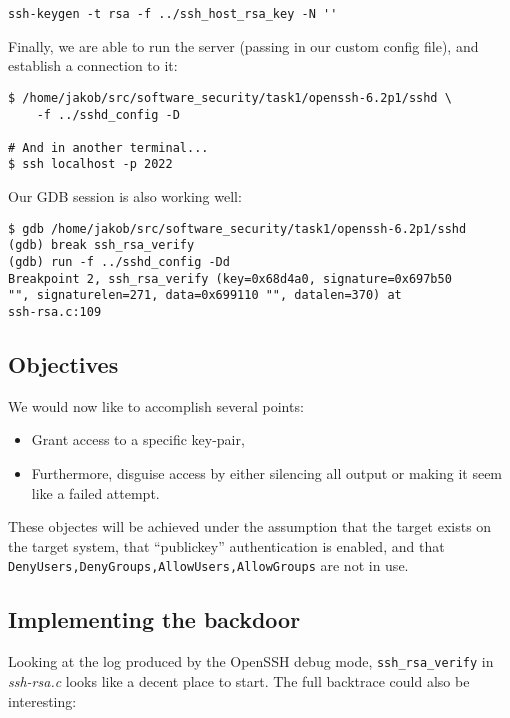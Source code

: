 \documentclass[a4paper,10pt]{article}
\begin{document}
\begin{verbatim}
ssh-keygen -t rsa -f ../ssh_host_rsa_key -N ''
\end{verbatim}

Finally, we are able to run the server (passing in our custom config file),
and establish a connection to it:

\begin{verbatim}
$ /home/jakob/src/software_security/task1/openssh-6.2p1/sshd \
    -f ../sshd_config -D
    
# And in another terminal...
$ ssh localhost -p 2022
\end{verbatim}

Our GDB session is also working well:

\begin{verbatim}
$ gdb /home/jakob/src/software_security/task1/openssh-6.2p1/sshd
(gdb) break ssh_rsa_verify
(gdb) run -f ../sshd_config -Dd
Breakpoint 2, ssh_rsa_verify (key=0x68d4a0, signature=0x697b50
"", signaturelen=271, data=0x699110 "", datalen=370) at 
ssh-rsa.c:109
\end{verbatim}

\subsection{Objectives}

We would now like to accomplish several points:

\begin{itemize}
\item Grant access to a specific key-pair, 
\item Furthermore, disguise access by either silencing all
      output or making it seem like a failed attempt.
\end{itemize}

These objectes will be achieved under the assumption that the target exists
on the target system, that ``publickey'' authentication is enabled, and that
\verb|DenyUsers,DenyGroups,AllowUsers,AllowGroups| are not in use.

\subsection{Implementing the backdoor}

Looking at the log produced by the OpenSSH debug mode, \lstinline|ssh_rsa_verify|
in \emph{ssh-rsa.c} looks like a decent place to start. The full backtrace
could also be interesting:
\end{document}

